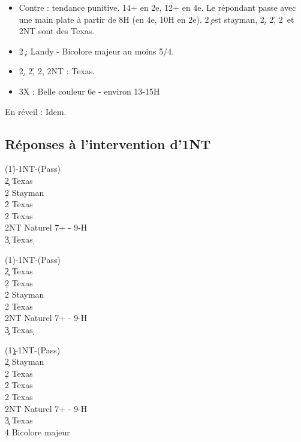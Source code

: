 \documentclass[a4paper]{article}
\begin{document}
\begin{itemize}
\item Contre : tendance punitive. 14+ en 2e, 12+ en 4e. Le répondant passe avec une main plate à partir de 8H (en 4e, 10H en 2e). 
    2\c\ est stayman, 2\d , 2\h , 2\s\ et 2NT sont des Texas.

\item 2\c\ : Landy - Bicolore majeur au moins 5/4.

\item 2\d , 2\h , 2\s , 2NT : Texas.

\item 3X : Belle couleur 6e - environ 13-15H

\end{itemize}

En réveil : Idem.

\subsection{Réponses à l'intervention d'1NT}

\begin{bidtable}
(1\h)-1NT-(Pass)\+\\
2\c \> Texas \d \\
2\d \> Stayman\\
2\h \> Texas \s \\
2\s \> Texas \c \\
2NT \> Naturel 7+ - 9-H\\
3\c \> Texas \d \-
\end{bidtable}

\begin{bidtable}
(1\s)-1NT-(Pass)\+\\
2\c \> Texas \d \\
2\d \> Texas \h \\
2\h \> Stayman\\
2\s \> Texas \c \\
2NT \> Naturel 7+ - 9-H\\
3\c \> Texas \d \-
\end{bidtable}

\begin{bidtable}
(1\c\d)-1NT-(Pass)\+\\
2\c \> Stayman\\
2\d \> Texas \h \\
2\h \> Texas \s \\
2\s \> Texas \c \\
2NT \> Naturel 7+ - 9-H\\
3\c \> Texas \d \\
4\d \> Bicolore majeur\-
\end{bidtable}
\end{document}
